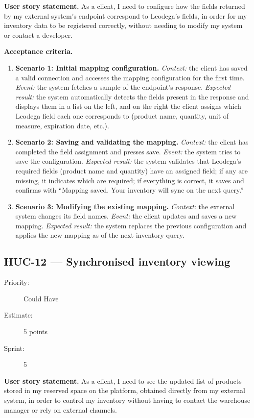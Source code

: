 \documentclass[11pt,a4paper,oneside]{report}
\begin{document}
\textbf{User story statement.} As a client, I need to configure how the fields returned by my external system's endpoint correspond to Leodega's fields, in order for my inventory data to be registered correctly, without needing to modify my system or contact a developer.

\textbf{Acceptance criteria.}
\begin{enumerate}
\item \textbf{Scenario 1: Initial mapping configuration.} \emph{Context:} the client has saved a valid connection and accesses the mapping configuration for the first time. \emph{Event:} the system fetches a sample of the endpoint's response. \emph{Expected result:} the system automatically detects the fields present in the response and displays them in a list on the left, and on the right the client assigns which Leodega field each one corresponds to (product name, quantity, unit of measure, expiration date, etc.).
\item \textbf{Scenario 2: Saving and validating the mapping.} \emph{Context:} the client has completed the field assignment and presses save. \emph{Event:} the system tries to save the configuration. \emph{Expected result:} the system validates that Leodega's required fields (product name and quantity) have an assigned field; if any are missing, it indicates which are required; if everything is correct, it saves and confirms with ``Mapping saved. Your inventory will sync on the next query.''
\item \textbf{Scenario 3: Modifying the existing mapping.} \emph{Context:} the external system changes its field names. \emph{Event:} the client updates and saves a new mapping. \emph{Expected result:} the system replaces the previous configuration and applies the new mapping as of the next inventory query.
\end{enumerate}

\subsection{HUC-12 --- Synchronised inventory viewing}
\label{req:HUC-12}
\begin{description}
\item[Priority:] Could Have \quad \item[Estimate:] 5 points \quad \item[Sprint:] 5
\end{description}

\textbf{User story statement.} As a client, I need to see the updated list of products stored in my reserved space on the platform, obtained directly from my external system, in order to control my inventory without having to contact the warehouse manager or rely on external channels.
\end{document}
